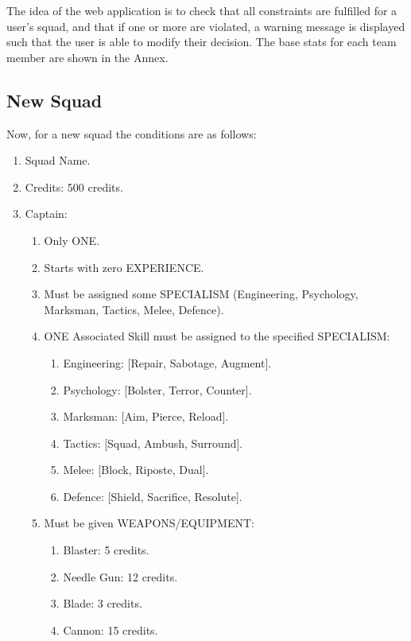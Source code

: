 \documentclass[12pt,a4paper]{article}
\begin{document}
The idea of the web application is to check that all constraints are fulfilled for a user's squad, and that if one or more are violated, a warning message is displayed such that the user is able to modify their decision. The base stats for each team member are shown in the Annex.

\subsection{New Squad}

Now, for a new squad the conditions are as follows:

\begin{enumerate}
 \item Squad Name.
 \item Credits: 500 credits.
 \item Captain: \begin{enumerate}
                 \item Only ONE.
                 \item Starts with zero EXPERIENCE.
                 \item Must be assigned some SPECIALISM (Engineering, Psychology, Marksman, Tactics, Melee, Defence).
                 \item ONE Associated Skill must be assigned to the specified SPECIALISM: \begin{enumerate}
							  \item Engineering: [Repair, Sabotage, Augment].
							  \item Psychology: [Bolster, Terror, Counter].
							  \item Marksman: [Aim, Pierce, Reload].
							  \item Tactics: [Squad, Ambush, Surround].
							  \item Melee: [Block, Riposte, Dual].
							  \item Defence: [Shield, Sacrifice, Resolute].
							 \end{enumerate}
				 \item Must be given WEAPONS/EQUIPMENT: \begin{enumerate}
				                                         \item Blaster: 5 credits.
				                                         \item Needle Gun: 12 credits.
				                                         \item Blade: 3 credits.
				                                         \item Cannon: 15 credits.

\end{enumerate}
\end{enumerate}
\end{enumerate}
\end{document}
